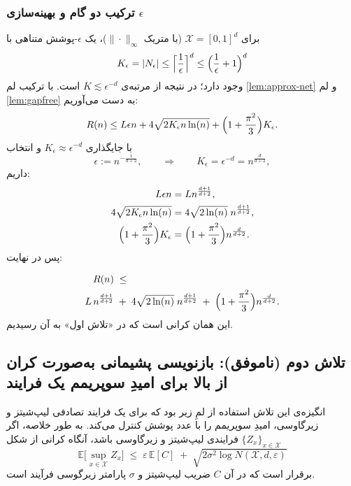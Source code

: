 \documentclass[a4paper,10pt,twocolumn]{article}
\begin{document}
\subsubsection{ترکیب دو گام و بهینه‌سازی $\epsilon$}
\label{subsec:opt-eps}

برای $\mathcal{X}=[0,1]^d$ (با متریک $\|\cdot\|_\infty$)، یک $\epsilon$-پوشش متناهی با
\[
K_\epsilon = |N_\epsilon| \le \Bigl\lceil \frac{1}{\epsilon}\Bigr\rceil^d \le \Bigl(\frac{1}{\epsilon}+1\Bigr)^d
\]
وجود دارد؛ در نتیجه از مرتبه‌ی $K\lesssim \epsilon^{-d}$ است.
با ترکیب لم \ref{lem:approx-net} و لم \ref{lem:gapfree} به دست می‌آوریم:
\[
R(n)
\le
L\epsilon n
+
4\sqrt{2K_\epsilon n\ln (n)}
+
\Bigl(1+\frac{\pi^2}{3}\Bigr)K_\epsilon.
\]
با جایگذاری $K_\epsilon \approx \epsilon^{-d}$ و انتخاب
\[
\epsilon := n^{-\frac{1}{d+2}},
\qquad\Rightarrow\qquad
K_\epsilon = \epsilon^{-d} = n^{\frac{d}{d+2}},
\]
داریم:
\begin{align*}
    L\epsilon n &= Ln^{\frac{d+1}{d+2}},\\
    4\sqrt{2K_\epsilon n\ln (n)} &= 4\sqrt{2\ln (n)}\;n^{\frac{d+1}{d+2}},\\
    \Bigl(1+\frac{\pi^2}{3}\Bigr)K_\epsilon &= \Bigl(1+\frac{\pi^2}{3}\Bigr)n^{\frac{d}{d+2}}.
\end{align*}
پس در نهایت:

\begin{align*}
    R(n)
    \;&\le\;\\
    L\,n^{\frac{d+1}{d+2}}
    \;&+\;
    4\sqrt{2\ln (n)}\;n^{\frac{d+1}{d+2}}
    \;+\;
    \Bigl(1+\frac{\pi^2}{3}\Bigr)n^{\frac{d}{d+2}}.
\end{align*}
این همان کرانی است که در «تلاش اول» به آن رسیدیم.







\subsection{تلاش دوم (ناموفق): بازنویسی پشیمانی به‌صورت کران از بالا برای امیدِ سوپریمم یک فرایند}
\label{sec:attempt2}

انگیزه‌ی این تلاش استفاده از لمِ زیر  بود که برای یک فرایند تصادفی لیپ‌شیتز و زیرگاوسی، امیدِ سوپریمم را با عدد پوشش کنترل می‌کند. به طور خلاصه، اگر $\{Z_x\}_{x\in \mathcal{X}}$ فرایندی لیپ‌شیتز و زیرگاوسی باشد، آنگاه کرانی از شکل
\[
\mathbb{E}\Big[\sup_{x\in \mathcal{X}} Z_x \Big]
\;\le\;
\varepsilon\,\mathbb{E}[C] \;+\; \sqrt{2\sigma^2 \log N(\mathcal{X},d,\varepsilon)}
\]
 برقرار است که در آن \(C\) ضریب لیپ‌شیتز و \(\sigma\) پارامتر زیرگوسی فرآیند است.
\end{document}

